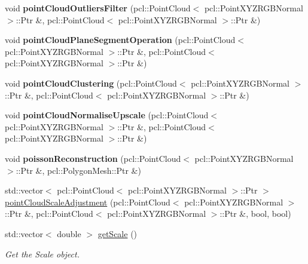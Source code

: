 \begin{DoxyCompactItemize}
\item 
\mbox{\label{classReconstruction_aab58cb52a7507ed64640c5e6645f296e}} 
void {\bfseries point\+Cloud\+Outliers\+Filter} (pcl\+::\+Point\+Cloud$<$ pcl\+::\+Point\+X\+Y\+Z\+R\+G\+B\+Normal $>$\+::Ptr \&, pcl\+::\+Point\+Cloud$<$ pcl\+::\+Point\+X\+Y\+Z\+R\+G\+B\+Normal $>$\+::Ptr \&)
\item 
\mbox{\label{classReconstruction_a1ea61518d67180a5d9d131d29a1b78c8}} 
void {\bfseries point\+Cloud\+Plane\+Segment\+Operation} (pcl\+::\+Point\+Cloud$<$ pcl\+::\+Point\+X\+Y\+Z\+R\+G\+B\+Normal $>$\+::Ptr \&, pcl\+::\+Point\+Cloud$<$ pcl\+::\+Point\+X\+Y\+Z\+R\+G\+B\+Normal $>$\+::Ptr \&)
\item 
\mbox{\label{classReconstruction_a9249ed4c0932b9fe460fada09ce38e67}} 
void {\bfseries point\+Cloud\+Clustering} (pcl\+::\+Point\+Cloud$<$ pcl\+::\+Point\+X\+Y\+Z\+R\+G\+B\+Normal $>$\+::Ptr \&, pcl\+::\+Point\+Cloud$<$ pcl\+::\+Point\+X\+Y\+Z\+R\+G\+B\+Normal $>$\+::Ptr \&)
\item 
\mbox{\label{classReconstruction_ad5749b9529d6f026ae9bb1084f63b276}} 
void {\bfseries point\+Cloud\+Normalise\+Upscale} (pcl\+::\+Point\+Cloud$<$ pcl\+::\+Point\+X\+Y\+Z\+R\+G\+B\+Normal $>$\+::Ptr \&, pcl\+::\+Point\+Cloud$<$ pcl\+::\+Point\+X\+Y\+Z\+R\+G\+B\+Normal $>$\+::Ptr \&)
\item 
\mbox{\label{classReconstruction_a42571b72e2c1ca984c259f3f4d319c75}} 
void {\bfseries poisson\+Reconstruction} (pcl\+::\+Point\+Cloud$<$ pcl\+::\+Point\+X\+Y\+Z\+R\+G\+B\+Normal $>$\+::Ptr \&, pcl\+::\+Polygon\+Mesh\+::\+Ptr \&)
\item 
std\+::vector$<$ pcl\+::\+Point\+Cloud$<$ pcl\+::\+Point\+X\+Y\+Z\+R\+G\+B\+Normal $>$\+::Ptr $>$ \hyperlink{classReconstruction_a8e8b20ec9b384b9dad21a3accfea98f2}{point\+Cloud\+Scale\+Adjustment} (pcl\+::\+Point\+Cloud$<$ pcl\+::\+Point\+X\+Y\+Z\+R\+G\+B\+Normal $>$\+::Ptr \&, pcl\+::\+Point\+Cloud$<$ pcl\+::\+Point\+X\+Y\+Z\+R\+G\+B\+Normal $>$\+::Ptr \&, bool, bool)
\item 
std\+::vector$<$ double $>$ \hyperlink{classReconstruction_aa26b3c0a0b3739c330b2c48f874c15c9}{get\+Scale} ()
\begin{DoxyCompactList}\small\item\em Get the Scale object. \end{DoxyCompactList}\item 

\end{DoxyCompactItemize}
